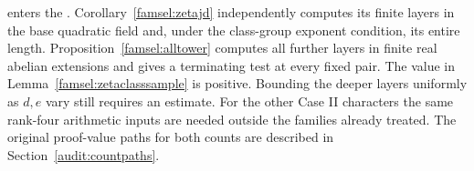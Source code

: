enters the .
Corollary~\ref{famsel:zetajd} independently computes its finite
layers in the base quadratic field and, under the class-group exponent
condition, its entire length. Proposition~\ref{famsel:alltower} computes
all further layers in finite real abelian extensions and gives a
terminating test at every fixed pair. The value in
Lemma~\ref{famsel:zetaclasssample} is positive. Bounding the deeper
layers uniformly as \(d,e\) vary still requires an estimate.
For the other Case II characters the same rank-four
arithmetic inputs are needed outside the families already treated.
The original proof-value paths for both counts are described in
Section~\ref{audit:countpaths}.
